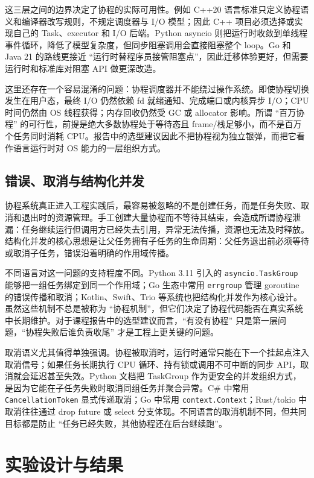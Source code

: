 \documentclass[UTF8,a4paper,12pt]{ctexart}
\begin{document}
这三层之间的边界决定了协程的实际可用性。例如 C++20 语言标准只定义协程语义和编译器改写规则，不规定调度器与 I/O 模型；因此 C++ 项目必须选择或实现自己的 Task、executor 和 I/O 后端。Python asyncio 则把运行时收敛到单线程事件循环，降低了模型复杂度，但同步阻塞调用会直接阻塞整个 loop。Go 和 Java 21 的路线更接近 ``运行时替程序员接管阻塞点''，因此迁移体验更好，但需要运行时和标准库对阻塞 API 做更深改造。

这里还存在一个容易混淆的问题：协程调度器并不能绕过操作系统。即使协程切换发生在用户态，最终 I/O 仍然依赖 fd 就绪通知、完成端口或内核异步 I/O；CPU 时间仍然由 OS 线程获得；内存回收仍然受 GC 或 allocator 影响。所谓 ``百万协程'' 的可行性，前提是绝大多数协程处于等待态且 frame/栈足够小，而不是百万个任务同时消耗 CPU。报告中的选型建议因此不把协程视为独立银弹，而把它看作语言运行时对 OS 能力的一层组织方式。

\subsection{错误、取消与结构化并发}

协程系统真正进入工程实践后，最容易被忽略的不是创建任务，而是任务失败、取消和退出时的资源管理。手工创建大量协程而不等待其结束，会造成所谓协程泄漏：任务继续运行但调用方已经失去引用，异常无法传播，资源也无法及时释放。结构化并发的核心思想是让父任务拥有子任务的生命周期：父任务退出前必须等待或取消子任务，错误沿着明确的作用域传播。

不同语言对这一问题的支持程度不同。Python 3.11 引入的 \verb|asyncio.TaskGroup| 能够把一组任务绑定到同一个作用域；Go 生态中常用 \verb|errgroup| 管理 goroutine 的错误传播和取消；Kotlin、Swift、Trio 等系统也把结构化并发作为核心设计。虽然这些机制不总是被称为 ``协程机制''，但它们决定了协程代码能否在真实系统中长期维护。对于课程报告中的选型建议而言，``有没有协程'' 只是第一层问题，``协程失败后谁负责收尾'' 才是工程上更关键的问题。

取消语义尤其值得单独强调。协程被取消时，运行时通常只能在下一个挂起点注入取消信号；如果任务长期执行 CPU 循环、持有锁或调用不可中断的同步 API，取消就会延迟甚至失效。Python 文档把 TaskGroup 作为更安全的并发组织方式，是因为它能在子任务失败时取消同组任务并聚合异常\cite{pythonTaskGroup}。C\# 中常用 \verb|CancellationToken| 显式传递取消；Go 中常用 \verb|context.Context|；Rust/tokio 中取消往往通过 drop future 或 select 分支体现。不同语言的取消机制不同，但共同目标都是防止 ``任务已经失败，其他协程还在后台继续跑''。

\section{实验设计与结果}
\end{document}
